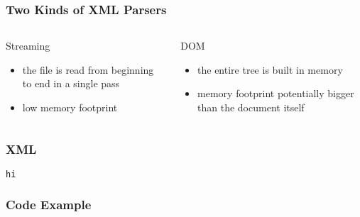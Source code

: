 \documentclass{beamer}
\begin{document}
\begin{frame}
  \frametitle{Two Kinds of XML Parsers}

  \begin{columns}
    \begin{block}{Streaming}
      \begin{itemize}
        \item the file is read from beginning to end in a single pass
        \item low memory footprint
      \end{itemize}
    \end{block}
    \begin{block}{DOM}
      \begin{itemize}
      \item the entire tree is built in memory
      \item memory footprint potentially bigger than the document itself
      \end{itemize}
    \end{block}
  \end{columns}
\end{frame}


\begin{frame}[fragile]

  \frametitle{XML}

\begin{verbatim}
hi
\end{verbatim}

\end{frame}


\begin{frame}[fragile]

  \frametitle{Code Example}

  \lstReadXml

\end{frame}
\end{document}
